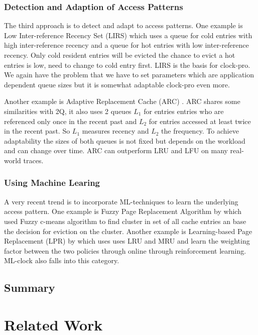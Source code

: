 \documentclass[
	12pt,
	a4paper,
	abstract,
	bibliography=totoc,
	chapterprefix,
	headings=openright,
	numbers=endperiod,
	parskip=half,
	twoside,
]{scrreprt}
\begin{document}
\subsection{Detection and Adaption of Access Patterns}
The third approach is to detect and adapt to access patterns.
One example is Low Inter-reference Recency Set (LIRS) \cite{10.1145/511399.511340} which uses a queue for cold entries with high inter-reference recency and a queue for hot entries with low inter-reference recency.
Only cold resident entries will be evicted the chance to evict a hot entries is low, need to change to cold entry first.
LIRS is the basis for clock-pro.
We again have the problem that we have to set parameters which are application dependent queue sizes but it is somewhat adaptable clock-pro even more.

Another example is Adaptive Replacement Cache (ARC) \cite{270366}.
ARC shares some similarities with 2Q, it also uses 2 queues $L_1$ for entries entries who are referenced only once in the recent past and $L_2$ for entries accessed at least twice in the recent past.
So  $L_1$ measures recency and $L_2$ the frequency.
To achieve adaptability the sizes of both queues is not fixed but depends on the workload and can change over time.
ARC can outperform LRU and LFU on many real-world traces.

\subsection{Using Machine Learing}
A very recent trend is to incorporate ML-techniques to learn the underlying access pattern.
One example is Fuzzy Page Replacement Algorithm by \cite{akbari2020page}
which used Fuzzy c-means algorithm to find cluster in set of all cache entries an base the decision for eviction on the cluster.
Another example is Learning-based Page Replacement (LPR) by \cite{kim2022lpr} which uses 
uses LRU and MRU and learn the weighting factor between the two policies through online through reinforcement learning.
ML-clock also falls into this category.

\section{Summary}



\chapter{Related Work}
\label{cha:related work}
\end{document}
